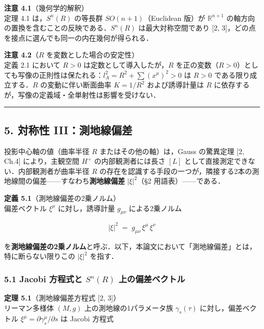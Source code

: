 \documentclass[a4paper,11pt]{ltjsarticle}
\theoremstyle{definition}
\begin{document}
\textbf{注意 4.1}（幾何学的解釈）\\
定理 4.1 は，\(S^n(R)\) の等長群 \(SO(n+1)\)（Euclidean 版）が \(\mathbb{R}^{n+1}\) の軸方向の置換を含むことの反映である．\(S^n(R)\) は最大対称空間であり {[}2, 3{]}，どの点を接点に選んでも同一の内在幾何が得られる．

\textbf{注意 4.2}（\(R\) を変数とした場合の安定性）\\
定義 2.1 において \(R > 0\) は定数として導入したが，\(R\) を正の変数（\(R > 0\)）としても写像の正則性は保たれる：\(l_A^2 = R^2 + \sum(x^\mu)^2 > 0\) は \(R > 0\) である限り成立する．\(R\) の変動に伴い断面曲率 \(K = 1/R^2\) および誘導計量は \(R\) に依存するが，写像の定義域・全単射性は影響を受けない．

\begin{center}\rule{0.5\linewidth}{0.5pt}\end{center}

\subsection{5. 対称性 III：測地線偏差}\label{ux5bfeux79f0ux6027-iiiux6e2cux5730ux7ddaux504fux5dee}

投影中心軸の値（曲率半径 \(R\) またはその他の軸）は，Gauss の驚異定理 {[}2, Ch.4{]} により，主観空間 \(H^+\) の内部観測者には長さ \([L]\) として直接測定できない．内部観測者が曲率半径 \(R\) の存在を認識する手段の一つが，隣接する2本の測地線間の偏差------すなわち\textbf{測地線偏差} \(|\xi|^2\)（§2 用語表）------である．

\textbf{定義 5.1}（測地線偏差の2乗ノルム）\\
偏差ベクトル \(\xi^\mu\) に対し，誘導計量 \(g_{\mu\nu}\) による2乗ノルム

\[|\xi|^2 \;=\; g_{\mu\nu}\,\xi^\mu\,\xi^\nu \tag{5.5}\]

を\textbf{測地線偏差の2乗ノルム}と呼ぶ．以下，本論文において「測地線偏差」とは，特に断らない限りこの \(|\xi|^2\) を指す．

\subsubsection{\texorpdfstring{5.1 Jacobi 方程式と \(S^n(R)\) 上の偏差ベクトル}{5.1 Jacobi 方程式と S\^{}n(R) 上の偏差ベクトル}}\label{jacobi-ux65b9ux7a0bux5f0fux3068-snr-ux4e0aux306eux504fux5deeux30d9ux30afux30c8ux30eb}

\textbf{定理 5.1}（測地線偏差方程式 {[}2, 3{]}）\\
リーマン多様体 \((M, g)\) 上の測地線の1パラメータ族 \(\gamma_s(\tau)\) に対し，偏差ベクトル \(\xi^\mu = \partial \gamma_s^\mu / \partial s\) は Jacobi 方程式
\end{document}
